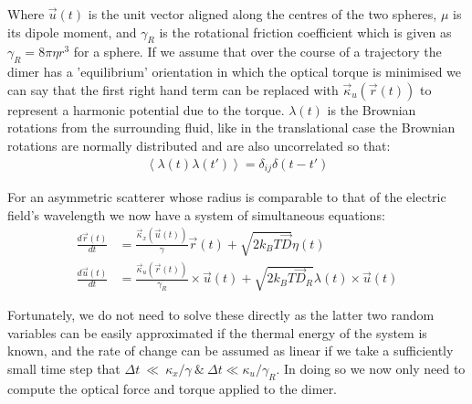 Where $\vec{u}(t)$ is the unit vector aligned along the centres of 
the two spheres, $\mu$ is its dipole moment, and $\gamma_R$ is the 
rotational friction coefficient which is given as $\gamma_R = 8\pi
\eta r^3$ for a sphere. If we assume that over the course of a 
trajectory the dimer has a 'equilibrium' orientation in which the 
optical torque is minimised we can say that the first right hand 
term can be replaced with $\vec{\kappa}_u(\vec{r}(t))$ to represent
a harmonic potential due to the torque. $\lambda(t)$ is the Brownian 
rotations from the surrounding fluid, like in the translational case 
the Brownian rotations are normally distributed and are also uncorrelated 
so that:
\begin{align}
  \left<\lambda(t)\lambda(t')\right> = \delta_{ij}\delta(t-t')
\end{align}

For an asymmetric scatterer whose radius is comparable to that of the 
electric field's wavelength we now have a system of simultaneous equations:
\begin{align}
	\label{eq:full_langevin}
  \frac{{d}\vec{r}(t)}{{dt}}
  &=
    \frac{\vec{\kappa}_x(\vec{u}(t))}{\gamma}\vec{r}(t) + \sqrt{2k_BT\vec{D}}\eta(t)
  \\
  \frac{{d}\vec{u}(t)}{{dt}}
  &=
    \frac{\vec{\kappa}_u(\vec{r}(t))}{\gamma_R}\times \vec{u}(t)
    + \sqrt{2k_BT\vec{D}_R}\lambda(t)\times \vec{u}(t)
\end{align}

Fortunately, we do not need to solve these directly as the latter two
random variables can be easily approximated if the thermal energy of
the system is known, and the rate of change can be assumed as linear if
we take a sufficiently small time step that $\Delta t~\ll~\kappa_x/\gamma 
\ \& \ \Delta t \ll \kappa_u/\gamma_R$. In doing so we now only need 
to compute the optical force and torque applied to the dimer. 

